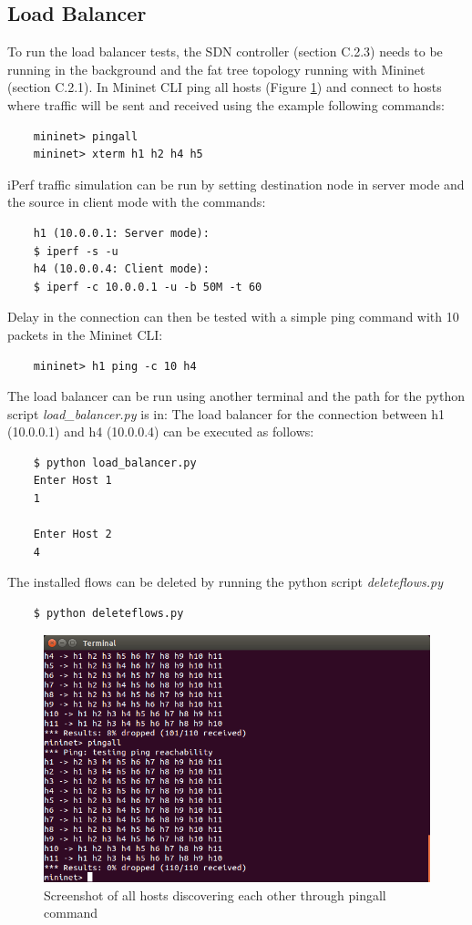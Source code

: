 \begin{appendices}
\subsection{Load Balancer}
To run the load balancer tests, the SDN controller (section C.2.3) needs to be running in the background and the fat tree topology running with Mininet (section C.2.1). In Mininet CLI ping all hosts (Figure \ref{fig:pingall}) and connect to hosts where traffic will be sent and received using the example following commands:
\begin{verbatim}
	mininet> pingall
	mininet> xterm h1 h2 h4 h5
\end{verbatim}
iPerf traffic simulation can be run by setting destination node in server mode and the source in client mode with the commands:
\begin{verbatim}
	h1 (10.0.0.1: Server mode):
	$ iperf -s -u
	h4 (10.0.0.4: Client mode):
	$ iperf -c 10.0.0.1 -u -b 50M -t 60
\end{verbatim}
Delay in the connection can then be tested with a simple ping command with 10 packets in the Mininet CLI:
\begin{verbatim}
	mininet> h1 ping -c 10 h4
\end{verbatim}
The load balancer can be run using another terminal and the path for the python script \textit{load\_balancer.py} is in:
The load balancer for the connection between h1 (10.0.0.1) and h4 (10.0.0.4) can be executed as follows:
\begin{verbatim}
	$ python load_balancer.py 
	Enter Host 1
	1

	Enter Host 2
	4
\end{verbatim}
The installed flows can be deleted by running the python script \textit{deleteflows.py}
\begin{verbatim}
	$ python deleteflows.py
\end{verbatim}

\begin{figure}[h!]
 \centering
 \includegraphics[width=\linewidth]{images/loadbalancing/mnpingall.png}
 \caption{Screenshot of all hosts discovering each other through pingall command}
 \label{fig:pingall}
\end{figure}


\end{appendices}